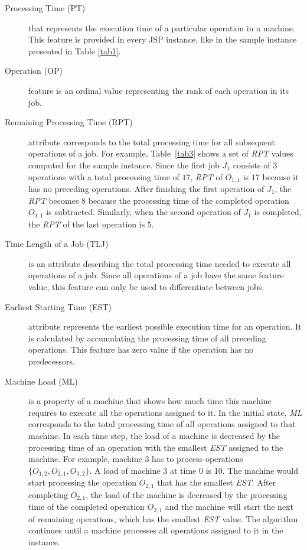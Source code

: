 \documentclass[runningheads]{llncs}
\begin{document}
\begin{description}
  \item[Processing Time (PT)] that represents the execution time of a particular operation in a machine. This feature is provided in every JSP instance, like in the sample instance presented in Table \ref{tab1}.
  
  \item[Operation (OP)] feature is an ordinal value representing the rank of each operation in its job.

  \item[Remaining Processing Time (RPT)] attribute corresponds to the total processing time for all subsequent operations of a job. For example, Table~\ref{tab3} shows a set of \textit{RPT} values computed for the sample instance. Since the first job $J_1$ consists of $3$ operations with a total processing time of $17$, \textit{RPT} of $O_{1,1}$ is $17$ because it has no preceding operations. After finishing the first operation of $J_1$, the \textit{RPT} becomes $8$ because the processing time of the completed operation $O_{1,1}$ is subtracted. Similarly, when the second operation of $J_1$ is completed, the \textit{RPT} of the last operation is $5$. 
  
  \item[Time Length of a Job (TLJ)] is an attribute describing the total processing time needed to execute all operations of a job. Since all operations of a job have the same feature value, this feature can only be used to differentiate between jobs.
  
  \item[Earliest Starting Time (EST)] attribute represents the earliest possible execution time for an operation. It is calculated by accumulating the processing time of all preceding operations. This feature has zero value if the operation has no predecessors.
  
  \item[Machine Load (ML)] is a property of a machine that shows how much time this machine requires to execute all the operations assigned to it. In the initial state, \textit{ML} corresponds to the total processing time of all operations assigned to that machine. In each time step, the load of a machine is decreased by the processing time of an operation with the smallest \textit{EST} assigned to the machine. For example, machine $3$ has to process operations $\{ O_{1,2}, O_{2,1}, O_{3,2} \}$. A load of machine $3$ at time $0$ is 10. The machine would start processing the operation $O_{2,1}$ that has the smallest \textit{EST}. After completing $O_{2,1}$, the load of the machine is decreased by the processing time of the completed operation $O_{2,1}$ and the machine will start the next of remaining operations, which has the smallest \textit{EST} value. The algorithm continues until a machine processes all operations assigned to it in the instance.
  

\end{description}
\end{document}
